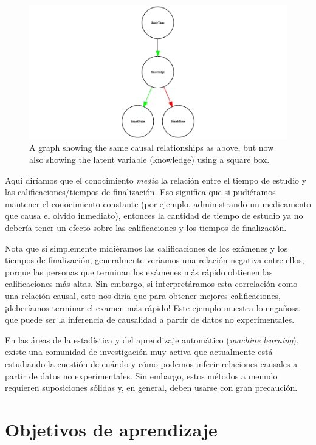 \documentclass[
  12pt,
]{book}
\begin{document}
\begin{figure}
\includegraphics[width=13.33in,height=0.5\textheight]{images/dag_latent_example} \caption{A graph showing the same causal relationships as above, but now also showing the latent variable (knowledge) using a square box.}\label{fig:latentCausalGraph}
\end{figure}

Aquí diríamos que el conocimiento \emph{media} la relación entre el tiempo de estudio y las calificaciones/tiempos de finalización. Eso significa que si pudiéramos mantener el conocimiento constante (por ejemplo, administrando un medicamento que causa el olvido inmediato), entonces la cantidad de tiempo de estudio ya no debería tener un efecto sobre las calificaciones y los tiempos de finalización.

Nota que si simplemente midiéramos las calificaciones de los exámenes y los tiempos de finalización, generalmente veríamos una relación negativa entre ellos, porque las personas que terminan los exámenes más rápido obtienen las calificaciones más altas. Sin embargo, si interpretáramos esta correlación como una relación causal, esto nos diría que para obtener mejores calificaciones, ¡deberíamos terminar el examen más rápido! Este ejemplo muestra lo engañosa que puede ser la inferencia de causalidad a partir de datos no experimentales.

En las áreas de la estadística y del aprendizaje automático (\emph{machine learning}), existe una comunidad de investigación muy activa que actualmente está estudiando la cuestión de cuándo y cómo podemos inferir relaciones causales a partir de datos no experimentales. Sin embargo, estos métodos a menudo requieren suposiciones sólidas y, en general, deben usarse con gran precaución.

\hypertarget{objetivos-de-aprendizaje}{%
\section{Objetivos de aprendizaje}\label{objetivos-de-aprendizaje}}
\end{document}

